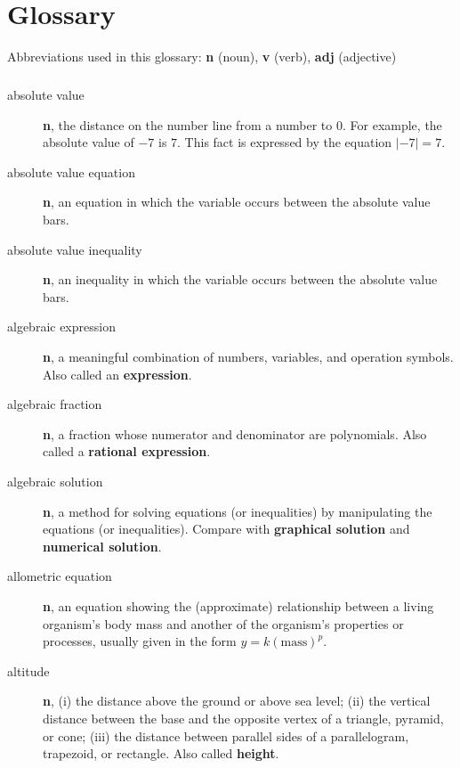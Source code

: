 \documentclass[10pt,]{book}
\newcommand{\terminology}[1]{\textbf{#1}}
\theoremstyle{plain}
\theoremstyle{definition}
\theoremstyle{definition}
\theoremstyle{definition}
\numberwithin{equation}{part}
\newcommand\abs[1]{\left|#1\right|}
\begin{document}
\chapter[{Glossary}]{Glossary}\label{glossary}
Abbreviations used in this glossary: \terminology{n} (noun), \terminology{v} (verb), \terminology{adj} (adjective)%
\typeout{************************************************}
\typeout{************************************************}
\paragraph[{}]{}\hypertarget{paragraphs-5}{}
\leavevmode%
\begin{description}
\item[{absolute value}]\hypertarget{li-454}{}\terminology{n}, the distance on the number line from a number to \(0\). For example, the absolute value of \(-7\) is \(7\). This fact is expressed by the equation \(\abs{-7} = 7\).%
\item[{absolute value equation}]\hypertarget{li-455}{}\terminology{n}, an equation in which the variable occurs between the absolute value bars.%
\item[{absolute value inequality}]\hypertarget{li-456}{}\terminology{n}, an inequality in which the variable occurs between the absolute value bars.%
\item[{algebraic expression}]\hypertarget{li-457}{}\terminology{n}, a meaningful combination of numbers, variables, and operation symbols. Also called an \terminology{expression}.%
\item[{algebraic fraction}]\hypertarget{li-458}{}\terminology{n}, a fraction whose numerator and denominator are polynomials. Also called a \terminology{rational expression}.%
\item[{algebraic solution}]\hypertarget{li-459}{}\terminology{n}, a method for solving equations (or inequalities) by manipulating the equations (or inequalities). Compare with \terminology{graphical solution} and \terminology{numerical solution}.%
\item[{allometric equation}]\hypertarget{li-460}{}\terminology{n}, an equation showing the (approximate) relationship between a living organism's body mass and another of the organism's properties or processes, usually given in the form \(y = k (\text{mass})^p\).%
\item[{altitude}]\hypertarget{li-461}{}\terminology{n}, (i) the distance above the ground or above sea level; (ii) the vertical distance between the base and the opposite vertex of a triangle, pyramid, or cone; (iii) the distance between parallel sides of a parallelogram, trapezoid, or rectangle. Also called \terminology{height}.%

\end{description}
\end{document}
